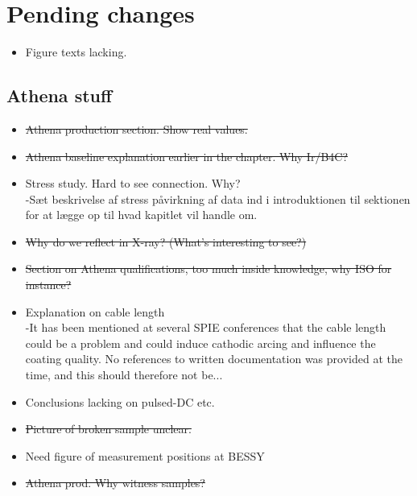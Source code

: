 \section{Pending changes}
\begin{itemize}
\item Figure texts lacking.
\end{itemize}
\subsection{Athena stuff}
\begin{itemize}

	\item \st{ Athena production section. Show real values.}
	\item \st{Athena baseline explanation earlier in the chapter. Why Ir/B4C?}
	\item Stress study. Hard to see connection. Why?\\
      -Sæt beskrivelse af stress påvirkning af data ind i introduktionen til sektionen for at lægge op til hvad kapitlet vil handle om.
	\item \st{Why do we reflect in X-ray? (What's interesting to see?)}\\

	\item \st{Section on Athena qualifications, too much inside knowledge, why ISO for instance?}\\

	\item Explanation on cable length\\
      -It has been mentioned at several SPIE conferences that the cable length could be a problem and could induce cathodic arcing and influence the coating quality. No references to written documentation was provided at the time, and this should therefore not be...
	\item Conclusions lacking on pulsed-DC etc.
	\item \st{Picture of broken sample unclear.}
	\item Need figure of measurement positions at BESSY
	\item \st{Athena prod. Why witness samples?}\\


\end{itemize}

